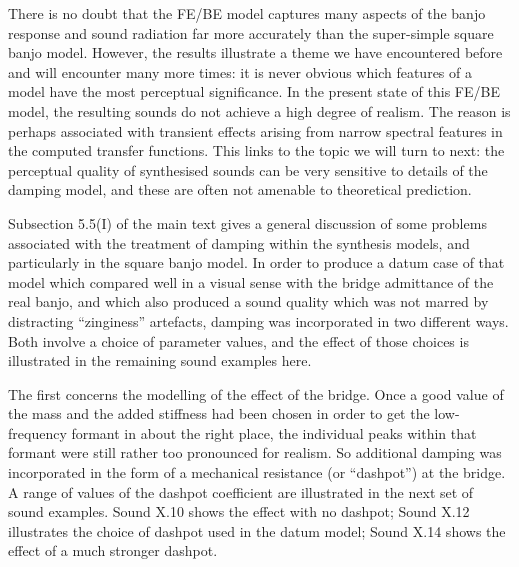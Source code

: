 
  There is no doubt that the FE/BE model captures many aspects of the banjo 
  response and sound radiation far more accurately than the super-simple square 
  banjo model. However, the results illustrate a theme we have encountered 
  before and will encounter many more times: it is never obvious which features 
  of a model have the most perceptual significance. In the present state of 
  this FE/BE model, the resulting sounds do not achieve a high degree of 
  realism. The reason is perhaps associated with transient effects arising from 
  narrow spectral features in the computed transfer functions. This links to 
  the topic we will turn to next: the perceptual quality of synthesised sounds 
  can be very sensitive to details of the damping model, and these are often 
  not amenable to theoretical prediction. 

  Subsection 5.5(I) of the main text gives a general discussion of some 
  problems associated with the treatment of damping within the synthesis 
  models, and particularly in the square banjo model. In order to produce a 
  datum case of that model which compared well in a visual sense with the 
  bridge admittance of the real banjo, and which also produced a sound quality 
  which was not marred by distracting ``zinginess'' artefacts, damping was 
  incorporated in two different ways. Both involve a choice of parameter 
  values, and the effect of those choices is illustrated in the remaining sound 
  examples here. 

  The first concerns the modelling of the effect of the bridge. Once a good 
  value of the mass and the added stiffness had been chosen in order to get the 
  low-frequency formant in about the right place, the individual peaks within 
  that formant were still rather too pronounced for realism. So additional 
  damping was incorporated in the form of a mechanical resistance (or 
  ``dashpot'') at the bridge. A range of values of the dashpot coefficient are 
  illustrated in the next set of sound examples. Sound X.10 shows the effect 
  with no dashpot; Sound X.12 illustrates the choice of dashpot used in the 
  datum model; Sound X.14 shows the effect of a much stronger dashpot. 


